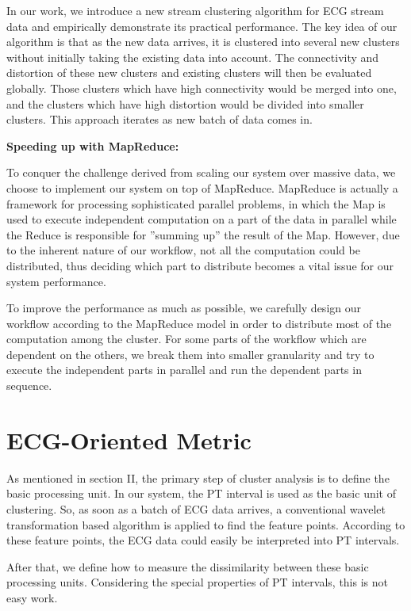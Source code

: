 \documentclass[conference]{IEEEtran}
\begin{document}
In our work, we introduce a new stream clustering algorithm for ECG stream data and empirically demonstrate its practical performance. The key idea of our algorithm is that as the new data arrives, it is clustered into several new clusters without initially taking the existing data into account. The connectivity and distortion of these new clusters and existing clusters will then be evaluated globally. Those clusters which have high connectivity would be merged into one, and the clusters which have high distortion would be divided into smaller clusters. This approach iterates as new batch of data comes in.


\textbf{Speeding up with MapReduce:}


To conquer the challenge derived from scaling our system over massive data, we choose to implement our system on top of MapReduce. MapReduce is actually a framework for processing sophisticated parallel problems, in which the Map is used to execute independent computation on a part of the data in parallel while the Reduce is responsible for ''summing up'' the result of the Map. However, due to the inherent nature of our workflow, not all the computation could be distributed, thus deciding which part to distribute becomes a vital issue for our system performance.


To improve the performance as much as possible, we carefully design our workflow according to the MapReduce model in order to distribute most of the computation among the cluster. For some parts of the workflow which are dependent on the others, we break them into smaller granularity and try to execute the independent parts in parallel and run the dependent parts in sequence.



\section{ECG-Oriented Metric}
As mentioned in section II, the primary step of cluster analysis is to define the basic processing unit. In our system, the PT interval is used as the basic unit of clustering. So, as soon as a batch of ECG data arrives, a conventional wavelet transformation based algorithm is applied to find the feature points. According to these feature points, the ECG data could easily be interpreted into PT intervals.

After that, we define how to measure the dissimilarity between these basic processing units. Considering the special properties of PT intervals, this is not easy work.
\end{document}
